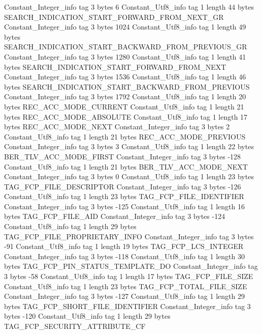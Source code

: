 {{{		}
		Constant_Integer_info {
			tag	3
			bytes	6
		}
		Constant_Utf8_info {
			tag	1
			length	44
			bytes	SEARCH_INDICATION_START_FORWARD_FROM_NEXT_GR
		}
		Constant_Integer_info {
			tag	3
			bytes	1024
		}
		Constant_Utf8_info {
			tag	1
			length	49
			bytes	SEARCH_INDICATION_START_BACKWARD_FROM_PREVIOUS_GR
		}
		Constant_Integer_info {
			tag	3
			bytes	1280
		}
		Constant_Utf8_info {
			tag	1
			length	41
			bytes	SEARCH_INDICATION_START_FORWARD_FROM_NEXT
		}
		Constant_Integer_info {
			tag	3
			bytes	1536
		}
		Constant_Utf8_info {
			tag	1
			length	46
			bytes	SEARCH_INDICATION_START_BACKWARD_FROM_PREVIOUS
		}
		Constant_Integer_info {
			tag	3
			bytes	1792
		}
		Constant_Utf8_info {
			tag	1
			length	20
			bytes	REC_ACC_MODE_CURRENT
		}
		Constant_Utf8_info {
			tag	1
			length	21
			bytes	REC_ACC_MODE_ABSOLUTE
		}
		Constant_Utf8_info {
			tag	1
			length	17
			bytes	REC_ACC_MODE_NEXT
		}
		Constant_Integer_info {
			tag	3
			bytes	2
		}
		Constant_Utf8_info {
			tag	1
			length	21
			bytes	REC_ACC_MODE_PREVIOUS
		}
		Constant_Integer_info {
			tag	3
			bytes	3
		}
		Constant_Utf8_info {
			tag	1
			length	22
			bytes	BER_TLV_ACC_MODE_FIRST
		}
		Constant_Integer_info {
			tag	3
			bytes	-128
		}
		Constant_Utf8_info {
			tag	1
			length	21
			bytes	BER_TLV_ACC_MODE_NEXT
		}
		Constant_Integer_info {
			tag	3
			bytes	0
		}
		Constant_Utf8_info {
			tag	1
			length	23
			bytes	TAG_FCP_FILE_DESCRIPTOR
		}
		Constant_Integer_info {
			tag	3
			bytes	-126
		}
		Constant_Utf8_info {
			tag	1
			length	23
			bytes	TAG_FCP_FILE_IDENTIFIER
		}
		Constant_Integer_info {
			tag	3
			bytes	-125
		}
		Constant_Utf8_info {
			tag	1
			length	16
			bytes	TAG_FCP_FILE_AID
		}
		Constant_Integer_info {
			tag	3
			bytes	-124
		}
		Constant_Utf8_info {
			tag	1
			length	29
			bytes	TAG_FCP_FILE_PROPRIETARY_INFO
		}
		Constant_Integer_info {
			tag	3
			bytes	-91
		}
		Constant_Utf8_info {
			tag	1
			length	19
			bytes	TAG_FCP_LCS_INTEGER
		}
		Constant_Integer_info {
			tag	3
			bytes	-118
		}
		Constant_Utf8_info {
			tag	1
			length	30
			bytes	TAG_FCP_PIN_STATUS_TEMPLATE_DO
		}
		Constant_Integer_info {
			tag	3
			bytes	-58
		}
		Constant_Utf8_info {
			tag	1
			length	17
			bytes	TAG_FCP_FILE_SIZE
		}
		Constant_Utf8_info {
			tag	1
			length	23
			bytes	TAG_FCP_TOTAL_FILE_SIZE
		}
		Constant_Integer_info {
			tag	3
			bytes	-127
		}
		Constant_Utf8_info {
			tag	1
			length	29
			bytes	TAG_FCP_SHORT_FILE_IDENTIFIER
		}
		Constant_Integer_info {
			tag	3
			bytes	-120
		}
		Constant_Utf8_info {
			tag	1
			length	29
			bytes	TAG_FCP_SECURITY_ATTRIBUTE_CF
}}}
